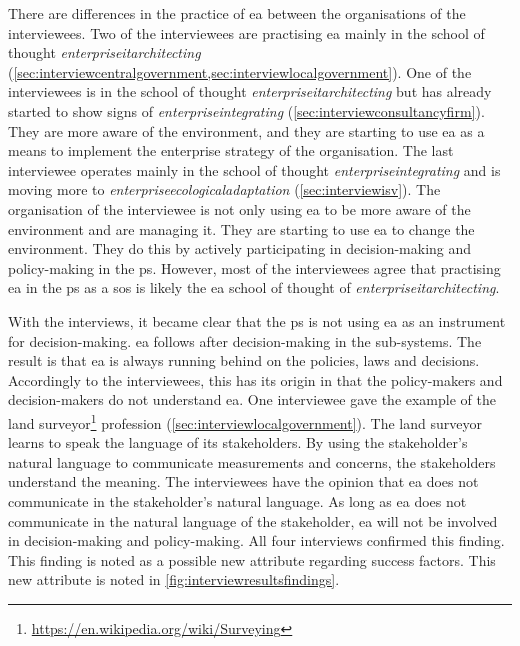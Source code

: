 There are differences in the practice of \acrshort{ea} between the organisations of the interviewees. Two of the interviewees are practising \acrshort{ea} mainly in the school of thought \textit{\gls{enterpriseitarchitecting}} (\cref{sec:interviewcentralgovernment,sec:interviewlocalgovernment}). One of the interviewees is in the school of thought \textit{\gls{enterpriseitarchitecting}} but has already started to show signs of \textit{\gls{enterpriseintegrating}} (\cref{sec:interviewconsultancyfirm}). They are more aware of the environment, and they are starting to use \acrshort{ea} as a means to implement the enterprise strategy of the organisation. The last interviewee operates mainly in the school of thought \textit{\gls{enterpriseintegrating}} and is moving more to \textit{\gls{enterpriseecologicaladaptation}} (\cref{sec:interviewisv}). The organisation of the interviewee is not only using \acrshort{ea} to be more aware of the environment and are managing it. They are starting to use \acrshort{ea} to change the environment. They do this by actively participating in decision-making and policy-making in the \gls{ps}. However, most of the interviewees agree that practising \acrshort{ea} in the \gls{ps} as a \acrlong{sos} is likely the \acrshort{ea} school of thought of \textit{\gls{enterpriseitarchitecting}}.

With the interviews, it became clear that the \gls{ps} is not using \acrshort{ea} as an instrument for decision-making. \acrshort{ea} follows after decision-making in the sub-systems. The result is that \acrshort{ea} is always running behind on the policies, laws and decisions. Accordingly to the interviewees, this has its origin in that the policy-makers and decision-makers do not understand \acrshort{ea}. One interviewee gave the example of the land surveyor\footnote{\url{https://en.wikipedia.org/wiki/Surveying}} profession (\cref{sec:interviewlocalgovernment}). The land surveyor learns to speak the language of its stakeholders. By using the stakeholder's natural language to communicate measurements and concerns, the stakeholders understand the meaning. The interviewees have the opinion that \acrshort{ea} does not communicate in the stakeholder's natural language. As long as \acrshort{ea} does not communicate in the natural language of the stakeholder, \acrshort{ea} will not be involved in decision-making and policy-making. All four interviews confirmed this finding. This finding is noted as a possible new \gls{attribute} regarding success factors. This new \gls{attribute} is noted in \cref{fig:interviewresultsfindings}.
